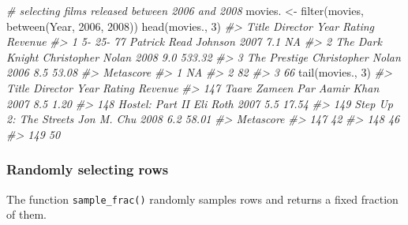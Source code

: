 \documentclass[
]{book}
\newenvironment{Shaded}{\begin{snugshade}}{\end{snugshade}}
\newcommand{\CommentTok}[1]{\textcolor[rgb]{0.56,0.35,0.01}{\textit{#1}}}
\newcommand{\DecValTok}[1]{\textcolor[rgb]{0.00,0.00,0.81}{#1}}
\newcommand{\FunctionTok}[1]{\textcolor[rgb]{0.00,0.00,0.00}{#1}}
\newcommand{\NormalTok}[1]{#1}
\newcommand{\OtherTok}[1]{\textcolor[rgb]{0.56,0.35,0.01}{#1}}
\begin{document}
\begin{Shaded}
\begin{Highlighting}[]
\CommentTok{\# selecting films released between 2006 and 2008}
\NormalTok{movies. }\OtherTok{\textless{}{-}} \FunctionTok{filter}\NormalTok{(movies, }\FunctionTok{between}\NormalTok{(Year, }\DecValTok{2006}\NormalTok{, }\DecValTok{2008}\NormalTok{))}
\FunctionTok{head}\NormalTok{(movies., }\DecValTok{3}\NormalTok{)}
\CommentTok{\#\textgreater{}             Title             Director Year Rating Revenue}
\CommentTok{\#\textgreater{} 1       5{-} 25{-} 77 Patrick Read Johnson 2007    7.1      NA}
\CommentTok{\#\textgreater{} 2 The Dark Knight    Christopher Nolan 2008    9.0  533.32}
\CommentTok{\#\textgreater{} 3    The Prestige    Christopher Nolan 2006    8.5   53.08}
\CommentTok{\#\textgreater{}   Metascore}
\CommentTok{\#\textgreater{} 1        NA}
\CommentTok{\#\textgreater{} 2        82}
\CommentTok{\#\textgreater{} 3        66}
\FunctionTok{tail}\NormalTok{(movies., }\DecValTok{3}\NormalTok{)}
\CommentTok{\#\textgreater{}                      Title   Director Year Rating Revenue}
\CommentTok{\#\textgreater{} 147       Taare Zameen Par Aamir Khan 2007    8.5    1.20}
\CommentTok{\#\textgreater{} 148        Hostel: Part II   Eli Roth 2007    5.5   17.54}
\CommentTok{\#\textgreater{} 149 Step Up 2: The Streets Jon M. Chu 2008    6.2   58.01}
\CommentTok{\#\textgreater{}     Metascore}
\CommentTok{\#\textgreater{} 147        42}
\CommentTok{\#\textgreater{} 148        46}
\CommentTok{\#\textgreater{} 149        50}
\end{Highlighting}
\end{Shaded}

\hypertarget{randomly-selecting-rows-1}{%
\subsubsection{Randomly selecting rows}\label{randomly-selecting-rows-1}}

The function \texttt{sample\_frac()} randomly samples rows and returns a fixed fraction of them.
\end{document}
